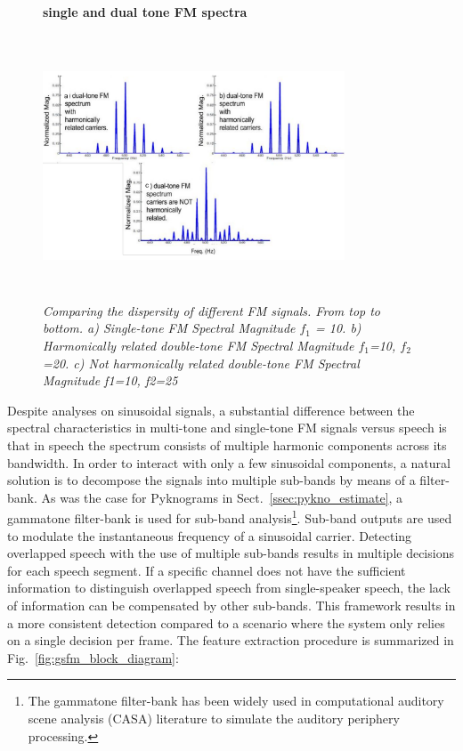 {\begin{figure}[h!]
	\centering
	\hspace{-1mm}
	\textbf{single and dual tone FM spectra}\par\medskip
	\includegraphics[height = 3.1in, width=0.8\textwidth]{figures/tone_FM_spectra}
	\vspace{-1mm}
	\caption{\it Comparing the dispersity of different FM signals.
		From top to bottom. 
		a) Single-tone FM Spectral Magnitude $f_1$ = 10. 
		b) Harmonically related double-tone FM Spectral Magnitude $f_1$=10, $f_2$=20. 
		c) Not harmonically related double-tone FM Spectral Magnitude f1=10, f2=25}
	\vspace{0mm}
	\label{fig:tone_fm_spectra}
\end{figure}

Despite analyses on sinusoidal signals, a substantial difference between the spectral characteristics in multi-tone and single-tone FM signals versus speech is that in speech the spectrum consists of multiple harmonic components across its bandwidth. 
In order to interact with only a few sinusoidal components, a natural solution is to decompose the signals into multiple sub-bands by means of a filter-bank. 
As was the case for Pyknograms in Sect.~\ref{ssec:pykno_estimate}, a gammatone filter-bank is used for sub-band analysis\footnote{The gammatone filter-bank has been widely used in computational auditory scene analysis (CASA) literature to simulate the auditory periphery processing.}. 
Sub-band outputs are used to modulate the instantaneous frequency of a sinusoidal carrier. 
Detecting overlapped speech with the use of multiple sub-bands results in multiple decisions for each speech segment. 
If a specific channel does not have the sufficient information to distinguish overlapped speech from single-speaker speech, the lack of information can be compensated by other sub-bands. 
This framework results in a more consistent detection compared to a scenario where the system only relies on a single decision per frame. 
The feature extraction procedure is summarized in Fig.~\ref{fig:gsfm_block_diagram}:

}
